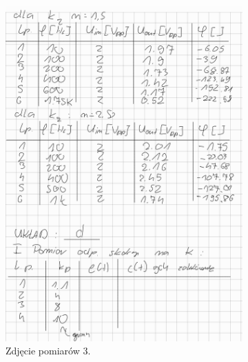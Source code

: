 \documentclass[12pt,a4paper]{article}
\begin{document}
\begin{figure}[H]
\begin{subfigure}[b]{0.46\textwidth}
			\includegraphics[width=\textwidth]{zdjecia/3.png}
			\caption{Zdjęcie pomiarów 3.}
			\label{fig:pomiar3}
		\end{subfigure}
		\hfill
		\begin{subfigure}[b]{0.46\textwidth}
			\centering

\end{subfigure}
\end{figure}
\end{document}
